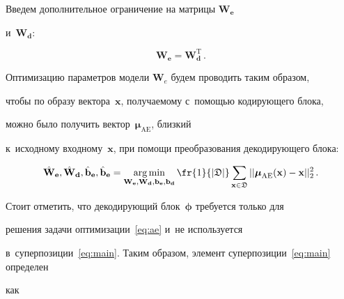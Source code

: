 Введем дополнительное ограничение на матрицы $\mathbf{W}_\textbf{e}$ 


и~$\mathbf{W}_{\textbf{d}}$:


$$


 \mathbf{W}_{\textbf{e}} = \mathbf{W}_{\textbf{d}}^{\mathrm{T}}\,.


$$





Оптимизацию параметров модели $\mathbf{W}_e$ будем проводить таким образом, 


чтобы по образу вектора~$\mathbf{x}$, получаемому с~помощью кодирующего блока, 


можно было получить вектор~$\mathbf{\boldsymbol{\mu}}_{\mathrm{AE}}$, близкий 


к~исходному входному~$\mathbf{x}$, при помощи преобразования декодирующего блока:





\noindent


\begin{equation}


\label{eq:ae}


 {\hat{\mathbf{W}}}_{\textbf{e}},\hat{\mathbf{W}}_{\textbf{d}},


 \hat{\mathbf{b}}_{\textbf{e}}, \hat{\mathbf{b}}_{\textbf{e}} = 


\mathop{\mathrm{arg\,min}}_{{\mathbf{W}}_{\textbf{e}},{\mathbf{W}}_{\textbf{d}},{\mathbf{b}}_{\textbf{e}}, 


{\mathbf{b}}_{\textbf{d}}} \fr{1}{|\mathfrak{D}|}\sum\limits_{\mathbf{x} \in 


\mathfrak{D}} ||\mathbf{\boldsymbol{\mu}}_{\mathrm{AE}}(\mathbf{x})-


\mathbf{x}||^2_2\,.


\end{equation}





Стоит отметить, что декодирующий блок~$\boldsymbol{\phi}$ требуется только для 


решения задачи оптимизации~\eqref{eq:ae} и~не используется 


в~суперпозиции~\eqref{eq:main}. Таким образом, элемент суперпозиции~\eqref{eq:main} определен 


как





\noindent


